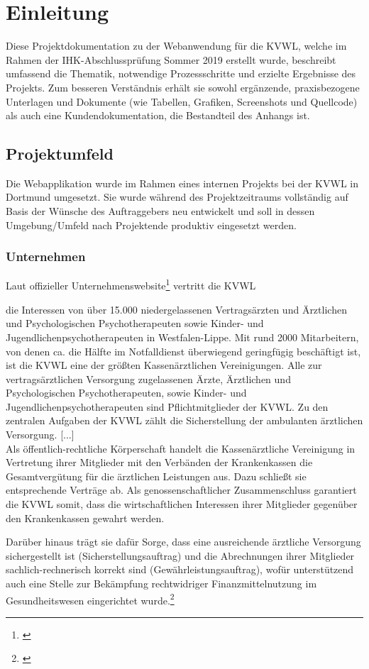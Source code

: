 \section{Einleitung}
\label{sec:Einleitung}
Diese Projektdokumentation zu der Webanwendung \projektName für die \ac{KVWL}, welche im Rahmen der IHK-Abschlussprüfung Sommer 2019 erstellt wurde, beschreibt umfassend \ua die Thematik, notwendige Prozessschritte und erzielte Ergebnisse des Projekts. Zum besseren Verständnis erhält sie sowohl ergänzende, praxisbezogene Unterlagen und Dokumente (wie Tabellen, Grafiken, Screenshots und Quellcode) als auch eine Kundendokumentation, die Bestandteil des Anhangs ist.

\subsection{Projektumfeld} 
\label{sec:Projektumfeld}
Die Webapplikation wurde im Rahmen eines internen Projekts bei der \ac{KVWL} in Dortmund umgesetzt. Sie wurde während des Projektzeitraums vollständig auf Basis der Wünsche des Auftraggebers neu entwickelt und soll in dessen Umgebung/Umfeld nach Projektende produktiv eingesetzt werden.

\subsubsection{Unternehmen} 
\label{sec:Unternehmen}
Laut offizieller Unternehmenswebsite\footnote{\cite{KVWL}} vertritt die \ac{KVWL}
\begin{displayquote}
	die Interessen von über 15.000 niedergelassenen Vertragsärzten und Ärztlichen und Psychologischen Psychotherapeuten sowie Kinder- und Jugendlichenpsychotherapeuten in Westfalen-Lippe. Mit rund 2000 Mitarbeitern, von denen ca. die Hälfte im Notfalldienst überwiegend geringfügig beschäftigt ist, ist die \ac{KVWL} eine der größten Kassenärztlichen Vereinigungen. Alle zur vertragsärztlichen Versorgung zugelassenen Ärzte, Ärztlichen und Psychologischen Psychotherapeuten, sowie Kinder- und Jugendlichenpsychotherapeuten sind Pflichtmitglieder der \ac{KVWL}. Zu den zentralen Aufgaben der \ac{KVWL} zählt die Sicherstellung der ambulanten ärztlichen Versorgung. [...]\\
	Als öffentlich-rechtliche Körperschaft handelt die Kassenärztliche Vereinigung in Vertretung ihrer Mitglieder mit den Verbänden der Krankenkassen die Gesamtvergütung für die ärztlichen Leistungen aus. Dazu schließt sie entsprechende Verträge ab. Als genossenschaftlicher Zusammenschluss garantiert die \ac{KVWL} somit, dass die wirtschaftlichen Interessen ihrer Mitglieder gegenüber den Krankenkassen gewahrt werden.
\end{displayquote}
Darüber hinaus trägt sie dafür Sorge, dass eine ausreichende ärztliche Versorgung sichergestellt ist (Sicherstellungsauftrag) und die Abrechnungen ihrer Mitglieder sachlich-rechnerisch korrekt sind (Gewährleistungsauftrag), wofür unterstützend auch eine Stelle zur Bekämpfung rechtwidriger Finanzmittelnutzung im Gesundheitswesen eingerichtet wurde.\footnote{\Vgl \cite{KVWL}}

